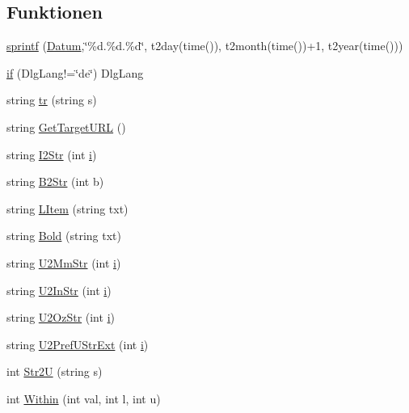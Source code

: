 \subsection*{Funktionen}
\begin{DoxyCompactItemize}
\item 
\hyperlink{_l_p-_daten_8ulp_a294dcde90e4e514aadcffd374f9d78ab}{sprintf} (\hyperlink{_l_p-_daten_8ulp_a56c3cee34ae375ca5905f9888799632f}{Datum},\char`\"{}\%d.\%d.\%d\char`\"{}, t2day(time()), t2month(time())+1, t2year(time()))
\item 
\hyperlink{_l_p-_daten_8ulp_a2621ce89f690c6c219f25cc1dad090dc}{if} (Dlg\+Lang!=\char`\"{}de\char`\"{}) Dlg\+Lang
\item 
string \hyperlink{_l_p-_daten_8ulp_a47e53f1f76c0dfceedc0401335138268}{tr} (string s)
\item 
string \hyperlink{_l_p-_daten_8ulp_a4b9405fe6735105731a3479933d3009d}{Get\+Target\+U\+R\+L} ()
\item 
string \hyperlink{_l_p-_daten_8ulp_a5feecb5cbdce456e9b855667d538b244}{I2\+Str} (int \hyperlink{test_8ulp_acb559820d9ca11295b4500f179ef6392}{i})
\item 
string \hyperlink{_l_p-_daten_8ulp_af6510b5f5ae67c3a1b2bf54e3508c88c}{B2\+Str} (int b)
\item 
string \hyperlink{_l_p-_daten_8ulp_abdcda950504d49acbdc448923e4793be}{L\+Item} (string txt)
\item 
string \hyperlink{_l_p-_daten_8ulp_a79bb7d6ea76402a9fe014895d397212d}{Bold} (string txt)
\item 
string \hyperlink{_l_p-_daten_8ulp_ad2eb73a303cbfe5e61450fa0cc6cab1b}{U2\+Mm\+Str} (int \hyperlink{test_8ulp_acb559820d9ca11295b4500f179ef6392}{i})
\item 
string \hyperlink{_l_p-_daten_8ulp_a1df9be7d7fb3eeb21755b58cb557a533}{U2\+In\+Str} (int \hyperlink{test_8ulp_acb559820d9ca11295b4500f179ef6392}{i})
\item 
string \hyperlink{_l_p-_daten_8ulp_a87506b881818c3eeab191b869ea38f49}{U2\+Oz\+Str} (int \hyperlink{test_8ulp_acb559820d9ca11295b4500f179ef6392}{i})
\item 
string \hyperlink{_l_p-_daten_8ulp_ac21e29b598b3fa062b86daa02363e0f9}{U2\+Pref\+U\+Str\+Ext} (int \hyperlink{test_8ulp_acb559820d9ca11295b4500f179ef6392}{i})
\item 
int \hyperlink{_l_p-_daten_8ulp_a418107da23d2a3b3fcf46c3e11d366f8}{Str2\+U} (string s)
\item 
int \hyperlink{_l_p-_daten_8ulp_a8da1f54183306a6f26e4fc3b0db05de7}{Within} (int val, int l, int u)

\end{DoxyCompactItemize}
